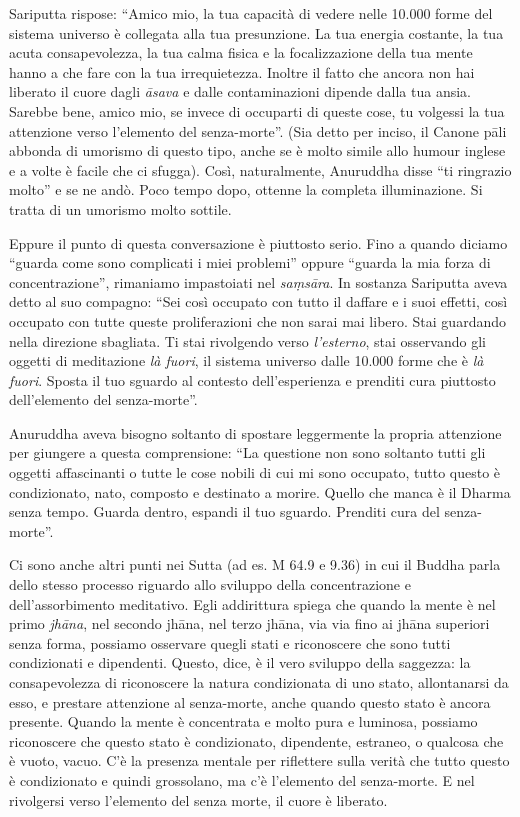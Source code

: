 Sariputta rispose: ``Amico mio, la tua capacità di vedere nelle 10.000 forme del sistema universo è collegata alla tua presunzione. La tua energia costante, la tua acuta consapevolezza, la tua calma fisica e la focalizzazione della tua mente hanno a che fare con la tua irrequietezza. Inoltre il fatto che ancora non hai liberato il cuore dagli \textit{āsava} e dalle contaminazioni dipende dalla tua ansia. Sarebbe bene, amico mio, se invece di occuparti di queste cose, tu volgessi la tua attenzione verso l'elemento del senza-morte''. (Sia detto per inciso, il Canone pāli abbonda di umorismo di questo tipo, anche se è molto simile allo humour inglese e a volte è facile che ci sfugga). Così, naturalmente, Anuruddha disse ``ti ringrazio molto'' e se ne andò. Poco tempo dopo, ottenne la completa illuminazione. Si tratta di un umorismo molto sottile.

Eppure il punto di questa conversazione è piuttosto serio. Fino a quando diciamo ``guarda come sono complicati i miei problemi'' oppure ``guarda la mia forza di concentrazione'', rimaniamo impastoiati nel \textit{saṃsāra}.\textit{ }In sostanza Sariputta\textit{ }aveva detto al suo compagno: ``Sei così occupato con tutto il daffare e i suoi effetti, così occupato con tutte queste proliferazioni che non sarai mai libero. Stai guardando nella direzione sbagliata. Ti stai rivolgendo verso \textit{l'esterno}, stai osservando gli oggetti di meditazione \textit{là fuori}, il sistema universo dalle 10.000 forme che è \textit{là fuori}. Sposta il tuo sguardo al contesto dell'esperienza e prenditi cura piuttosto dell'elemento del senza-morte''. 

Anuruddha aveva bisogno soltanto di spostare leggermente la propria attenzione per giungere a questa comprensione: ``La questione non sono soltanto tutti gli oggetti affascinanti o tutte le cose nobili di cui mi sono occupato, tutto questo è condizionato, nato, composto e destinato a morire. Quello che manca è il Dharma senza tempo. Guarda dentro, espandi il tuo sguardo. Prenditi cura del senza-morte''.

Ci sono anche altri punti nei Sutta (ad es. M 64.9 e 9.36) in cui il Buddha parla dello stesso processo riguardo allo sviluppo della concentrazione e dell'assorbimento meditativo. Egli addirittura spiega che quando la mente è nel primo \textit{jhāna}, nel secondo jhāna, nel terzo jhāna, via via fino ai jhāna superiori senza forma, possiamo osservare quegli stati e riconoscere che sono tutti condizionati e dipendenti. Questo, dice, è il vero sviluppo della saggezza: la consapevolezza di riconoscere la natura condizionata di uno stato, allontanarsi da esso, e prestare attenzione al senza-morte, anche quando questo stato è ancora presente. Quando la mente è concentrata e molto pura e luminosa, possiamo riconoscere che questo stato è condizionato, dipendente, estraneo, o qualcosa che è vuoto, vacuo. C'è la presenza mentale per riflettere sulla verità che tutto questo è condizionato e quindi grossolano, ma c'è l'elemento del senza-morte. E nel rivolgersi verso l'elemento del senza morte, il cuore è liberato.


